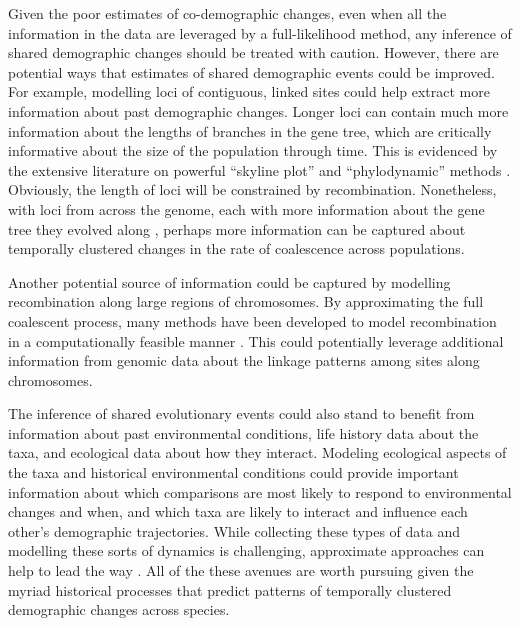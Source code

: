 Given the poor estimates of co-demographic changes, even when all the
information in the data are leveraged by a full-likelihood method, any
inference of shared demographic changes should be treated with caution.
However, there are potential ways that estimates of shared demographic
events could be improved.
For example, modelling loci of contiguous, linked sites could help
extract more information about past demographic changes.
Longer loci can contain much more information about the lengths of branches in
the gene tree, which are critically informative about the size of the
population through time.
This is evidenced by the extensive literature on powerful 
``skyline plot'' and ``phylodynamic'' methods
\citep{Pybus2000,Strimmer2001,OpgenRhein2005,Drummond2005,Heled2008,Minin2008beast,Ho2011,Palacios2012,Palacios2012UAI,Stadler2013,Gill2013,Palacios2014,Lan2015,Karcher2016,Karcher2017,Faulkner2018,Karcher2019}.
Obviously, the length of loci will be constrained by recombination.
Nonetheless, with loci from across the genome, each with more information about
the gene tree they evolved along \citep{Speidel2019},
perhaps more information can be captured about temporally clustered changes in
the rate of coalescence across populations.

Another potential source of information could be captured by modelling
recombination along large regions of chromosomes.
By approximating the full coalescent process, many methods have been developed
to model recombination in a computationally feasible manner
\citep{McVean2005,Marjoram2006,Chen2009,Li2011,Sheehan2013,Schiffels2014,Rasmussen2014,Palacios2015}.
This could potentially leverage additional information from genomic data about the
linkage patterns among sites along chromosomes.

The inference of shared evolutionary events could also stand to benefit from
information about
past environmental conditions,
life history data about the taxa,
and ecological data about how they interact.
Modeling ecological aspects of the taxa and historical environmental conditions
could provide important information about which comparisons are most likely to
respond to environmental changes and when, and which taxa are likely to
interact and influence each other's demographic trajectories.
While collecting these types of data and modelling these sorts of dynamics
is challenging, approximate approaches can help to lead the way
\citep{He2013,Massatti2016,Bemmels2016,Knowles2017,Papadopoulou2016}.
All of the these avenues are worth pursuing given the myriad historical
processes that predict patterns of temporally clustered demographic changes
across species.
